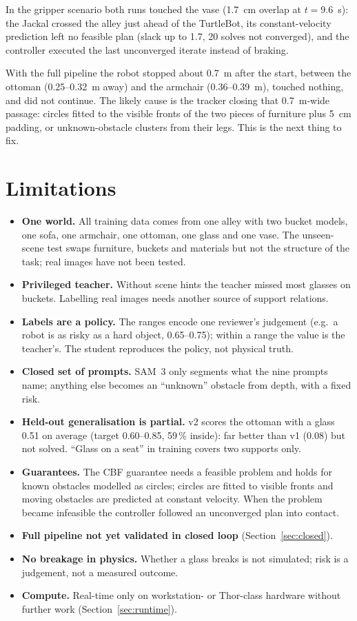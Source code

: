 \documentclass[10pt,a4paper]{article}
\begin{document}
In the gripper scenario both runs touched the vase (1.7~cm overlap at $t=9.6$~s): the Jackal crossed the alley just ahead of the
TurtleBot, its constant-velocity prediction left no feasible plan (slack up to 1.7, 20 solves not converged), and the controller
executed the last unconverged iterate instead of braking.

With the full pipeline the robot stopped about 0.7~m after the start, between the ottoman (0.25--0.32~m away) and the armchair
(0.36--0.39~m), touched nothing, and did not continue. The likely cause is the tracker closing that 0.7~m-wide passage: circles
fitted to the visible fronts of the two pieces of furniture plus 5~cm padding, or unknown-obstacle clusters from their legs.
This is the next thing to fix.

\section{Limitations}\label{sec:lim}
\begin{itemize}
\item \textbf{One world.} All training data comes from one alley with two bucket models, one sofa, one armchair, one ottoman, one
glass and one vase. The unseen-scene test swaps furniture, buckets and materials but not the structure of the task; real images
have not been tested.
\item \textbf{Privileged teacher.} Without scene hints the teacher missed most glasses on buckets. Labelling real images needs
another source of support relations.
\item \textbf{Labels are a policy.} The ranges encode one reviewer's judgement (e.g.\ a robot is as risky as a hard object,
0.65--0.75); within a range the value is the teacher's. The student reproduces the policy, not physical truth.
\item \textbf{Closed set of prompts.} SAM~3 only segments what the nine prompts name; anything else becomes an ``unknown'' obstacle
from depth, with a fixed risk.
\item \textbf{Held-out generalisation is partial.} v2 scores the ottoman with a glass 0.51 on average (target 0.60--0.85, 59\,\%
inside): far better than v1 (0.08) but not solved. ``Glass on a seat'' in training covers two supports only.
\item \textbf{Guarantees.} The CBF guarantee needs a feasible problem and holds for known obstacles modelled as circles; circles
are fitted to visible fronts and moving obstacles are predicted at constant velocity. When the problem became infeasible the
controller followed an unconverged plan into contact.
\item \textbf{Full pipeline not yet validated in closed loop} (Section~\ref{sec:closed}).
\item \textbf{No breakage in physics.} Whether a glass breaks is not simulated; risk is a judgement, not a measured outcome.
\item \textbf{Compute.} Real-time only on workstation- or Thor-class hardware without further work (Section~\ref{sec:runtime}).
\end{itemize}
\end{document}

